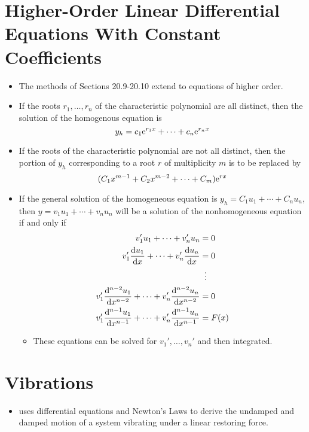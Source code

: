 \documentclass[../main.tex]{subfiles}
\begin{document}
\section{Higher-Order Linear Differential Equations With Constant Coefficients}
\begin{itemize}
    \item The methods of Sections 20.9-20.10 extend to equations of higher order.
    \item If the roots $r_1,\dots,r_n$ of the characteristic polynomial are all distinct, then the solution of the homogenous equation is
    \begin{equation*}
        y_h = c_1\e[r_1x]+\cdots+c_n\e[r_nx]
    \end{equation*}
    \item If the roots of the characteristic polynomial are not all distinct, then the portion of $y_h$ corresponding to a root $r$ of multiplicity $m$ is to be replaced by
    \begin{equation*}
        (C_1x^{m-1}+C_2x^{m-2}+\cdots+C_m)\e[rx]
    \end{equation*}
    \item If the general solution of the homogeneous equation is $y_h=C_1u_1+\cdots+C_nu_n$, then $y=v_1u_1+\cdots+v_nu_n$ will be a solution of the nonhomogeneous equation if and only if
    \begin{align*}
        v_1'u_1+\cdots+v_n'u_n &= 0\\
        v_1'\dv{u_1}{x}+\cdots+v_n'\dv{u_n}{x} &= 0\\
        &\hspace{5.5pt}\vdots\\
        v_1'\dv[n-2]{u_1}{x}+\cdots+v_n'\dv[n-2]{u_n}{x} &= 0\\
        v_1'\dv[n-1]{u_1}{x}+\cdots+v_n'\dv[n-1]{u_n}{x} &= F(x)
    \end{align*}
    \begin{itemize}
        \item These equations can be solved for $v_1',\dots,v_n'$ and then integrated.
    \end{itemize}
\end{itemize}



\section{Vibrations}
\begin{itemize}
    \item \textcite{bib:Thomas} uses differential equations and Newton's Laws to derive the undamped and damped motion of a system vibrating under a linear restoring force.
\end{itemize}
\end{document}
